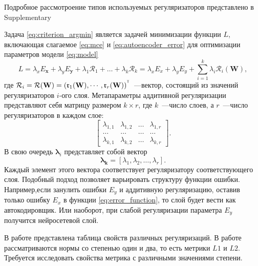 \documentclass[12pt, twoside]{article}
\newcommand{\rk}{\mathfrak{r}}
\newcommand{\xb}{{\mathbf{x}}}
\newenvironment{comment}{}{}
\newcommand{\T}{^{\text{\tiny\sffamily\upshape\mdseries T}}}
\newcommand{\y}{{\mathbf{y}}}
\newcommand{\w}{{\mathbf{W}}}
\newcommand{\wm}{{\mathbf{w}}}
\begin{document}
Подробное рассмотроение типов используемых регуляризаторов представлено в Supplementary

Задача \eqref{eq:criterion_argmin} является задачей минимизации функции $L$, включающая слагаемое \eqref{eq:mce} и \eqref{eq:autoencoder_error} для оптимизации параметров модели \eqref{eq:model}
\begin{equation}\label{eq:error_function}
L = \lambda_xE_{\xb} + \lambda_yE_{\y} + \lambda_1\mathcal{R}_1+\dots+\lambda_k\mathcal{R}_k = \lambda_xE_x + \lambda_yE_y + \sum\limits_{i = 1}^k\mathbb{\lambda}_i \mathcal{R}_i(\mathbf{W}),
\end{equation}
где $\mathcal{R}_i = \mathcal{R}(\mathbf{W}) = (\rk_1(\mathbf{W}), \cdots , \rk_r(\mathbf{W}))^{\T}$~---вектор, состоящий из значений регуляризаторов $i$-ого слоя.%
 Метапараметры аддитивной регуляризации представляют себя матрицу размером $k\times r$, где $k$~---число слоев, а $r$~---число регуляризаторов в каждом слое:
\[
\begin{bmatrix}
\lambda_{1,1}& \lambda_{1,2}&\dots&\lambda_{1,r}\\
\dots& \dots&\dots&\dots \\
\lambda_{k,1}& \lambda_{k,2}&\dots&\lambda_{k,r}
\end{bmatrix}.
\]
В свою очередь $\boldsymbol{\lambda}_i$ представляет собой вектор
\begin{equation}\label{eq4}
\mathbf{\lambda_k} = \left[\lambda_1,\lambda_2,\dots,\lambda_r \right].
\end{equation}
Каждый элемент этого вектора соответствует регуляризатору соответствующего слоя.
Подобный подход позволяет варьировать структуру функции ошибки. Например,если занулить ошибки $E_y$ и аддитивную регуляризацию, оставив только ошибку $E_x$ в функции \eqref{eq:error_function}, то слой будет вести как автокодировщик. Или наоборот, при слабой регуляризации параметра $E_y$ получится нейросетевой слой.

\begin{comment}
В работе \cite{bib_1} представлена таблица свойств различных регуляризаций. В работе рассматриваются нормы со степенью один и два, то есть метрики $L1$ и $L2$. Требуется исследовать свойства метрика с различными значениями степени. 
\end{comment}
\end{document}
